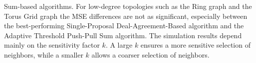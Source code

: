 Sum-based algorithms. For low-degree topologies such as the Ring graph and the Torus Grid graph the MSE differences are not as significant, especially between the best-performing Single-Proposal Deal-Agreement-Based algorithm and the Adaptive Threshold Push-Pull Sum algorithm. The simulation results depend mainly on the sensitivity factor $k$. A large $k$ ensures a more sensitive selection of neighbors, while a smaller $k$ allows a coarser selection of neighbors.